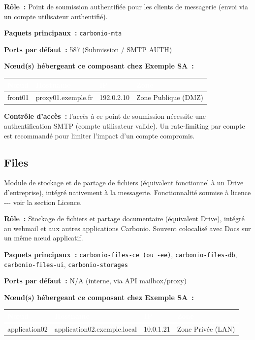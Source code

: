 \documentclass[11pt,a4paper]{report}
\newcommand{\tblhead}[1]{\textcolor{white}{\textbf{#1}}}
\begin{document}
\textbf{Rôle~:} Point de soumission authentifiée pour les clients de messagerie (envoi via un compte utilisateur authentifié).\allowbreak{}


\textbf{Paquets principaux~:} \texttt{carbonio-\allowbreak{}mta}

\textbf{Ports par défaut~:} 587 (Submission / SMTP AUTH)

\textbf{Nœud(s) hébergeant ce composant chez Exemple SA~:}
\begin{longtable}{|p{3.2cm}|p{4.5cm}|p{3.2cm}|p{2.3cm}|}
\hline
\rowcolor{primary}\tblhead{Nœud} & \tblhead{Hostname} & \tblhead{IP} & \tblhead{Zone} \\
\hline
\endhead
front01 & proxy01.\allowbreak{}exemple.\allowbreak{}fr & 192.\allowbreak{}0.\allowbreak{}2.\allowbreak{}10 & Zone Publique (DMZ) \\
\hline
\end{longtable}

\textbf{Contrôle d'accès~:} l'accès à ce point de soumission nécessite une authentification SMTP (compte utilisateur valide). Un rate-limiting par compte est recommandé pour limiter l'impact d'un compte compromis.



\subsection{Files}

Module de stockage et de partage de fichiers (équivalent fonctionnel à un Drive d'entreprise), intégré nativement à la messagerie.\allowbreak{} Fonctionnalité soumise à licence -\allowbreak{}-\allowbreak{}-\allowbreak{} voir la section Licence.\allowbreak{}

\textbf{Rôle~:} Stockage de fichiers et partage documentaire (équivalent Drive), intégré au webmail et aux autres applications Carbonio.\allowbreak{} Souvent colocalisé avec Docs sur un même nœud applicatif.\allowbreak{}

\textbf{Paquets principaux~:} \texttt{carbonio-\allowbreak{}files-\allowbreak{}ce (ou -\allowbreak{}ee)}, \texttt{carbonio-\allowbreak{}files-\allowbreak{}db}, \texttt{carbonio-\allowbreak{}files-\allowbreak{}ui}, \texttt{carbonio-\allowbreak{}storages}

\textbf{Ports par défaut~:} N/A (interne, via API mailbox/proxy)

\textbf{Nœud(s) hébergeant ce composant chez Exemple SA~:}
\begin{longtable}{|p{3.2cm}|p{4.5cm}|p{3.2cm}|p{2.3cm}|}
\hline
\rowcolor{primary}\tblhead{Nœud} & \tblhead{Hostname} & \tblhead{IP} & \tblhead{Zone} \\
\hline
\endhead
application02 & application02.\allowbreak{}exemple.\allowbreak{}local & 10.\allowbreak{}0.\allowbreak{}1.\allowbreak{}21 & Zone Privée (LAN) \\
\hline
\end{longtable}
\end{document}
